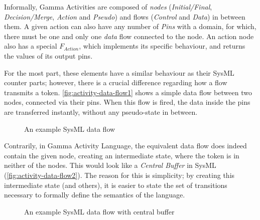 \begin{definition}
Informally, Gamma Activities are composed of \emph{nodes} (\emph{Initial/Final}, \emph{Decision/Merge}, \emph{Action} and \emph{Pseudo}) and flows (\emph{Control} and \emph{Data}) in between them. A given action can also have any number of \emph{Pins} with a domain, for which, there must be one and only one \emph{data} flow connected to the node. An action node also has a special \(F_{Action}\), which implements its specific behaviour, and returns the values of its output pins.

For the most part, these elements have a similar behaviour as their SysML counter parts; however, there is a crucial difference regarding how a flow transmits a token. \autoref{fig:activity-data-flow1} shows a simple data flow between two nodes, connected via their pins. When this flow is fired, the data inside the pins are transferred instantly, without any pseudo-state in between. 

\begin{figure}[!ht]
	\centering
	
	\caption{An example SysML data flow}
	\label{fig:activity-data-flow1}
\end{figure}

Contrarily, in Gamma Activity Language, the equivalent data flow does indeed contain the given node, creating an intermediate state, where the token is in neither of the nodes. This would look like a \emph{Central Buffer} in SysML (\autoref{fig:activity-data-flow2}). The reason for this is simplicity; by creating this intermediate state (and others), it is easier to state the set of transitions necessary to formally define the semantics of the language.

\begin{figure}[!ht]
	\centering
	
	\caption{An example SysML data flow with central buffer}
	\label{fig:activity-data-flow2}
\end{figure}
	
\end{definition}

